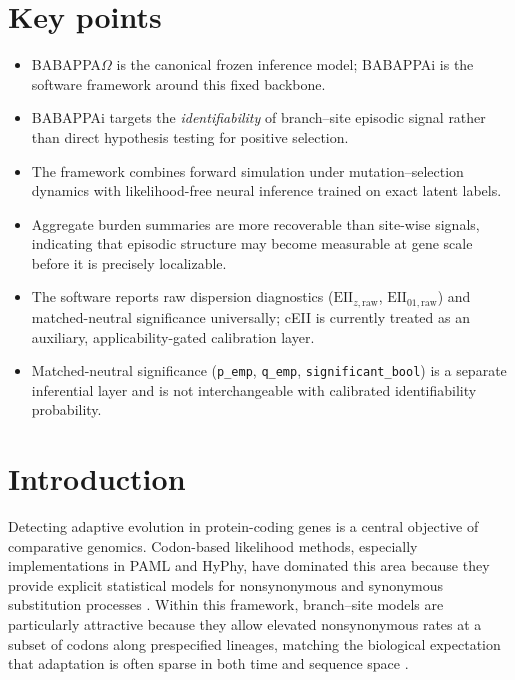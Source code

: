\documentclass[11pt]{article}
\begin{document}
\section*{Key points}
\begin{itemize}
    \item BABAPPA$\Omega$ is the canonical frozen inference model; BABAPPAi is the software framework around this fixed backbone.
    \item BABAPPAi targets the \emph{identifiability} of branch--site episodic signal rather than direct hypothesis testing for positive selection.
    \item The framework combines forward simulation under mutation--selection dynamics with likelihood-free neural inference trained on exact latent labels.
    \item Aggregate burden summaries are more recoverable than site-wise signals, indicating that episodic structure may become measurable at gene scale before it is precisely localizable.
    \item The software reports raw dispersion diagnostics ($\mathrm{EII}_{z,\mathrm{raw}}$, $\mathrm{EII}_{01,\mathrm{raw}}$) and matched-neutral significance universally; cEII is currently treated as an auxiliary, applicability-gated calibration layer.
    \item Matched-neutral significance (\texttt{p\_emp}, \texttt{q\_emp}, \texttt{significant\_bool}) is a separate inferential layer and is not interchangeable with calibrated identifiability probability.
\end{itemize}

\section{Introduction}

Detecting adaptive evolution in protein-coding genes is a central objective of comparative genomics. Codon-based likelihood methods, especially implementations in PAML and HyPhy, have dominated this area because they provide explicit statistical models for nonsynonymous and synonymous substitution processes \cite{Yang2007,Murrell2012,KosakovskyPond2020}. Within this framework, branch--site models are particularly attractive because they allow elevated nonsynonymous rates at a subset of codons along prespecified lineages, matching the biological expectation that adaptation is often sparse in both time and sequence space \cite{AnisimovaYang2007,YangDosReis2011,KosakovskyPond2011}.
\end{document}
